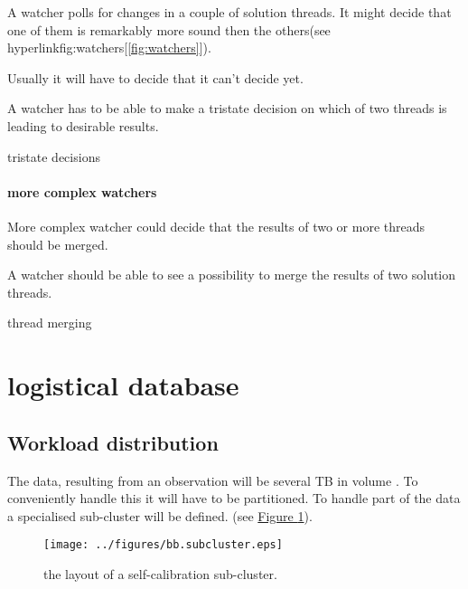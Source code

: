 \documentclass[]{lofar}
\begin{document}
          A watcher polls for changes in a couple of solution
          threads. It might decide that one of them is remarkably more
          sound then the others(see
          hyperlink{fig:watchers}{[\ref{fig:watchers}]}).

          Usually it will have to decide that it can't decide yet.

          \begin{requirement}
            A watcher has to be able to make a tristate decision on
            which of two threads is leading to desirable results.
            \caption{tristate decisions\label{req:no-decision}}
          \end{requirement}

        \paragraph{more complex watchers}
        \label{par:complex-watchers}\hypertarget{par:complex-watchers}{}

          More complex watcher could decide that the results of two or
          more threads should be merged.

          \begin{requirement}
            A watcher should be able to see a possibility to merge the
            results of two solution threads.
            \caption{thread merging\label{req:merge}}
          \end{requirement}

  \section{logistical database}
  \label{sec:logistical-datamodel}
  \hypertarget{sec:logistical-datamodel}{}

    \subsection{Workload distribution}
    \label{subsec:workload-distribution-2}\hypertarget{subsec:workload-distribution-2}{}

      The data, resulting from an observation will be several TB in
      volume
      \cite{bib:LOFAR-ASTRON-MEM-035}. To
      conveniently handle this it will have to be partitioned. To
      handle part of the data a specialised sub-cluster will be
      defined. (see \hyperlink{fig:bb.subcluster}{Figure \ref{fig:bb.subcluster}}).

      \begin{figure}
        \texttt{[image: ../figures/bb.subcluster.eps]}
        \hypertarget{fig:bb.subcluster}{}
        \caption{the layout of a self-calibration sub-cluster.\label{fig:bb.subcluster}}
      \end{figure}
\end{document}
